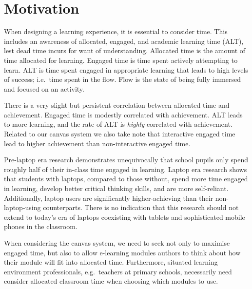 \section{Motivation}
When designing a learning experience, it is essential to consider time. This 
includes an awareness of allocated, engaged, and academic learning time (ALT), 
lest dead time incurs for want of understanding. Allocated time is the amount 
of time allocated for learning. Engaged time is time spent actively attempting 
to learn. ALT is time spent engaged in appropriate learning that leads to high 
levels of success\cite{cotton1990educational}; i.e.\ time spent in the flow. 
Flow is the state of being fully immersed and focused on an 
activity\cite{murphy2011games}.

There is a very slight but persistent correlation between allocated time and 
achievement\cite{cotton1981time, walberg1988synthesis, cotton1990educational}. 
Engaged time is modestly correlated with achievement\cite{cotton1981time, 
sanford1983time, cotton1990educational}. ALT leads to more 
learning\cite{walberg1988synthesis}, and the rate of ALT is \emph{highly} 
correlated with achievement\cite{cotton1981time, sanford1983time, 
walberg1988synthesis, cotton1990educational}. Related to our canvas system we 
also take note that interactive engaged time lead to higher achievement than 
non-interactive engaged time\cite{sanford1983time, cotton1990educational}.

Pre-laptop era research demonstrates unequivocally that school pupils only 
spend roughly half of their in-class time engaged in 
learning\cite{cotton1990educational}. Laptop era research shows that students 
with laptops, compared to those without, spend more time engaged in learning, 
develop better critical thinking skills, and are more self-reliant. 
Additionally, laptop users are significantly higher-achieving than their 
non-laptop-using counterparts\cite{cengiz2005learning}. There is no indication 
that this research should not extend to today's era of laptops coexisting with 
tablets and sophisticated mobile phones in the classroom.

When considering the canvas system, we need to seek not only to maximise 
engaged time, but also to allow e-learning modules authors to think about how 
their module will fit into allocated time. Furthermore, situated learning 
environment professionals, e.g.\ teachers at primary schools, necessarily need 
consider allocated classroom time when choosing which modules to use. 

